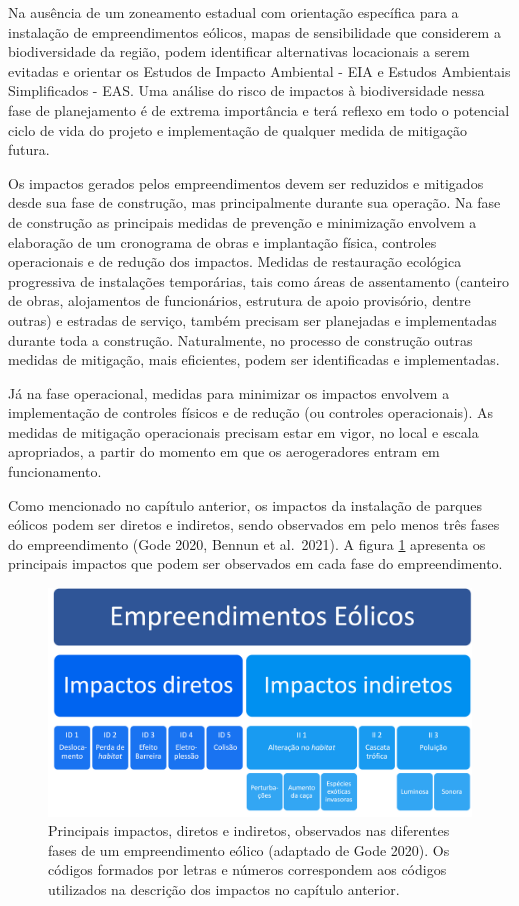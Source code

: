 \documentclass[
  oneside]{scrbook}
\begin{document}
Na ausência de um zoneamento estadual com orientação específica para a instalação de empreendimentos eólicos, mapas de sensibilidade que considerem a biodiversidade da região, podem identificar alternativas locacionais a serem evitadas e orientar os Estudos de Impacto Ambiental - EIA e Estudos Ambientais Simplificados - EAS. Uma análise do risco de impactos à biodiversidade nessa fase de planejamento é de extrema importância e terá reflexo em todo o potencial ciclo de vida do projeto e implementação de qualquer medida de mitigação futura.

Os impactos gerados pelos empreendimentos devem ser reduzidos e mitigados desde sua fase de construção, mas principalmente durante sua operação. Na fase de construção as principais medidas de prevenção e minimização envolvem a elaboração de um cronograma de obras e implantação física, controles operacionais e de redução dos impactos. Medidas de restauração ecológica progressiva de instalações temporárias, tais como áreas de assentamento (canteiro de obras, alojamentos de funcionários, estrutura de apoio provisório, dentre outras) e estradas de serviço, também precisam ser planejadas e implementadas durante toda a construção. Naturalmente, no processo de construção outras medidas de mitigação, mais eficientes, podem ser identificadas e implementadas.

Já na fase operacional, medidas para minimizar os impactos envolvem a implementação de controles físicos e de redução (ou controles operacionais). As medidas de mitigação operacionais precisam estar em vigor, no local e escala apropriados, a partir do momento em que os aerogeradores entram em funcionamento.

Como mencionado no capítulo anterior, os impactos da instalação de parques eólicos podem ser diretos e indiretos, sendo observados em pelo menos três fases do empreendimento (Gode 2020, Bennun et al.~2021). A figura \ref{fig:16} apresenta os principais impactos que podem ser observados em cada fase do empreendimento.

\begin{figure}[H]

{\centering \includegraphics[width=0.75\linewidth]{imagens/cap05/Figura_5.1} 

}

\caption{Principais impactos, diretos e indiretos, observados nas diferentes fases de um empreendimento eólico (adaptado de Gode 2020). Os códigos formados por letras e números correspondem aos códigos utilizados na descrição dos  impactos  no capítulo anterior.}\label{fig:16}
\end{figure}
\end{document}
